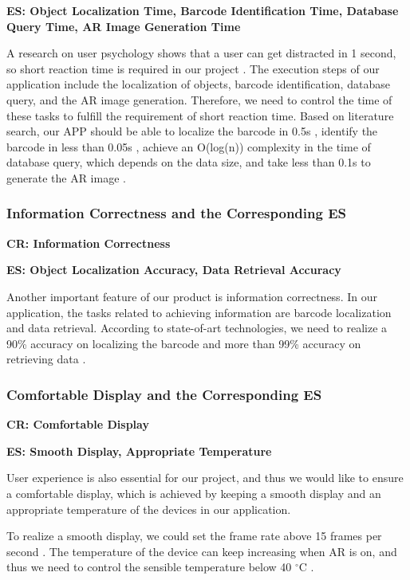 \documentclass[11pt,a4paper]{article}
\begin{document}
\begin{onehalfspace}
\textbf{ES: Object Localization Time, Barcode Identification Time, Database Query Time, AR Image Generation Time}
        
A research on user psychology shows that a user can get distracted in 1 second, so short reaction time is required in our project \cite{reactionTime}. The execution steps of our application include the localization of objects, barcode identification, database query, and the AR image generation. Therefore, we need to control the time of these tasks to fulfill the requirement of short reaction time. Based on literature search, our APP should be able to localize the barcode in 0.5s \cite{localization}, identify the barcode in less than 0.05s \cite{identification}, achieve an O(log(n)) complexity in the time of database query, which depends on the data size, and take less than 0.1s to generate the AR image \cite{generateAR}.

\subsubsection{Information Correctness and the Corresponding ES}
\textbf{CR: Information Correctness}

\textbf{ES: Object Localization Accuracy, Data Retrieval Accuracy}

Another important feature of our product is information correctness. In our application, the tasks related to achieving information are barcode localization and data retrieval. According to state-of-art technologies, we need to realize a 90\% accuracy on localizing the barcode \cite{localAccuarcy} and more than 99\% accuracy on retrieving data \cite{dataAccuarcy}.

\subsubsection{Comfortable Display and the Corresponding ES}
\textbf{CR: Comfortable Display}

\textbf{ES: Smooth Display, Appropriate Temperature}

User experience is also essential for our project, and thus we would like to ensure a comfortable display, which is achieved by keeping a smooth display and an appropriate temperature of the devices in our application.

To realize a smooth display, we could set the frame rate above 15 frames per second \cite{smooth}. The temperature of the device can keep increasing when AR is on, and thus we need to control the sensible temperature below 40 $^\circ$C \cite{temperatureApple}\cite{temperatureGoogle}.


\end{onehalfspace}
\end{document}
